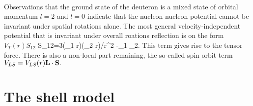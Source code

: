\\
Observations that the ground state of the deuteron is a mixed state of orbital 
momentum $l=2$ and $l=0$ indicate that the nucleon-nucleon potential cannot be 
invariant under spatial rotations alone. The most general velocity-independent potential that is invariant under overall roations reflection is on the form $V_T(r)S_{12}$
\be
S_{12}=3(\bold \sigma_1 \cdot \bold r)(\bold \sigma_2 \cdot \bold r)/r^2 -\bold \sigma_1 \cdot \sigma_2.
\ee
This term gives rise to the tensor force.
There is also a non-local part remaining, the so-called spin orbit term  
$V_{LS}=V_{LS}(r)\bold{L\cdot S}.$ 


\section{The shell model}

